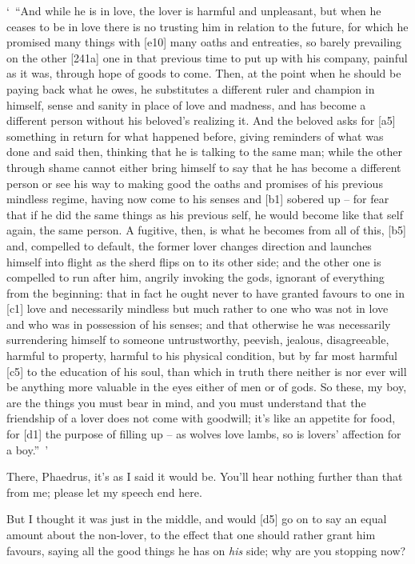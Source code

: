 ‘~“And while he is in love, the lover is harmful and unpleasant, but
when he ceases to be in love there is no trusting him in relation to the
future, for which he promised many things with {[}e10{]} many oaths and
entreaties, so barely prevailing on the other {[}241a{]} one in that
previous time to put up with his company, painful as it was, through
hope of goods to come. Then, at the point when he should be paying back
what he owes, he substitutes a different ruler and champion in himself,
sense and sanity in place of love and madness, and has become a
different person without his beloved's realizing it. And the beloved
asks for {[}a5{]} something in return for what happened
before, giving reminders
of what was done and said then, thinking that he is talking to the same
man; while the other through shame cannot either bring himself to say
that he has become a different person or see his way to making good the
oaths and promises of his previous mindless regime, having now come to
his senses and {[}b1{]} sobered
up -- for fear that if he
did the same things as his previous self, he would become like that self
again, the same person. A fugitive, then, is what he becomes from all of
this, {[}b5{]} and, compelled to default, the former lover changes
direction and launches himself into flight as the sherd flips on to its
other side; and the other
one is compelled to run after him, angrily invoking the gods, ignorant
of everything from the beginning: that in fact he ought never to have
granted favours to one in {[}c1{]} love and
necessarily mindless but
much rather to one who was not in love and who was in possession of his
senses; and that otherwise he was necessarily surrendering himself to
someone untrustworthy, peevish, jealous, disagreeable, harmful to
property, harmful to his physical condition, but by far most harmful
{[}c5{]} to the education of his soul, than which in truth there neither
is nor ever will be anything more valuable in the eyes either of men or
of gods. So these, my boy, are the things you must bear in mind, and you
must understand that the friendship of a lover does not come with
goodwill; it's like an appetite for food, for {[}d1{]} the purpose of
filling up -- as wolves love lambs, so is lovers' affection for a
boy.”~'

There, Phaedrus, it's as I said it would
be. You'll hear nothing
further than that from me; please let my speech end here.

 But I thought it was just in the middle, and would {[}d5{]} go
on to say an equal amount about the non-lover, to the effect that one
should rather grant him favours, saying all the good things he has on
{\em his} side; why are you stopping now?


